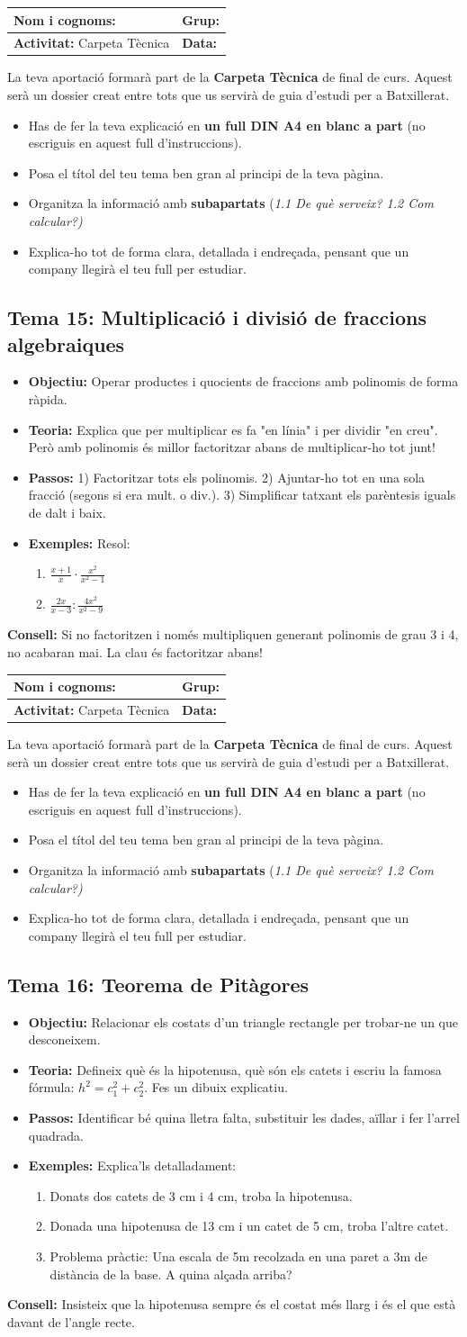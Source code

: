 \documentclass[12pt,a4paper]{article}
\newcommand{\introcomuna}{
    \begin{tcolorbox}[colback=gray!5,colframe=gray!50!black,title=\textbf{La Carpeta Tècnica de Matemàtiques}]
    La teva aportació formarà part de la \textbf{Carpeta Tècnica} de final de curs. Aquest serà un dossier creat entre tots que us servirà de guia d'estudi per a Batxillerat.
    
    \begin{itemize}[label=\textbullet, leftmargin=*]
        \item Has de fer la teva explicació en \textbf{un full DIN A4 en blanc a part} (no escriguis en aquest full d'instruccions).
        \item Posa el títol del teu tema ben gran al principi de la teva pàgina.
        \item Organitza la informació amb \textbf{subapartats} (\textit{1.1 De què serveix? 1.2 Com calcular?)}
        \item Explica-ho tot de forma clara, detallada i endreçada, pensant que un company llegirà el teu full per estudiar.
    \end{itemize}
    \end{tcolorbox}
    \vspace{0.1cm}
}
\newcommand{\capcaleraalumne}[1]{
    \begingroup
    \renewcommand{\arraystretch}{2.2}
    \begin{tabularx}{\textwidth}{|X|p{4cm}|}
    \hline
    \textbf{Nom i cognoms:} & \textbf{Grup:} \\ \hline
    \textbf{Activitat:} Carpeta Tècnica & \textbf{Data:} \\ \hline
    \end{tabularx}
    \endgroup
    \vspace{0.4cm}
}
\begin{document}
\newpage
\capcaleraalumne{15}
\introcomuna
\subsection*{Tema 15: Multiplicació i divisió de fraccions algebraiques}
\begin{itemize}[label=\textbullet]
    \item \textbf{Objectiu:} Operar productes i quocients de fraccions amb polinomis de forma ràpida.
    \item \textbf{Teoria:} Explica que per multiplicar es fa "en línia" i per dividir "en creu". Però amb polinomis és millor factoritzar abans de multiplicar-ho tot junt!
    \item \textbf{Passos:} 1) Factoritzar tots els polinomis. 2) Ajuntar-ho tot en una sola fracció (segons si era mult. o div.). 3) Simplificar tatxant els parèntesis iguals de dalt i baix.
    \item \textbf{Exemples:} Resol:
    \begin{enumerate}[label=\alph*)]
        \item $\displaystyle \frac{x+1}{x} \cdot \frac{x^2}{x^2-1}$
        \item $\displaystyle \frac{2x}{x-3} : \frac{4x^2}{x^2-9}$
    \end{enumerate}
\end{itemize}
\vfill
\noindent\textbf{Consell:} Si no factoritzen i només multipliquen generant polinomis de grau 3 i 4, no acabaran mai. La clau és factoritzar abans!

\newpage
\capcaleraalumne{16}
\introcomuna
\subsection*{Tema 16: Teorema de Pitàgores}
\begin{itemize}[label=\textbullet]
    \item \textbf{Objectiu:} Relacionar els costats d'un triangle rectangle per trobar-ne un que desconeixem.
    \item \textbf{Teoria:} Defineix què és la hipotenusa, què són els catets i escriu la famosa fórmula: $h^2 = c_1^2 + c_2^2$. Fes un dibuix explicatiu.
    \item \textbf{Passos:} Identificar bé quina lletra falta, substituir les dades, aïllar i fer l'arrel quadrada.
    \item \textbf{Exemples:} Explica'ls detalladament:
    \begin{enumerate}[label=\alph*)]
        \item Donats dos catets de 3 cm i 4 cm, troba la hipotenusa.
        \item Donada una hipotenusa de 13 cm i un catet de 5 cm, troba l'altre catet.
        \item Problema pràctic: Una escala de 5m recolzada en una paret a 3m de distància de la base. A quina alçada arriba?
    \end{enumerate}
\end{itemize}
\vfill
\noindent\textbf{Consell:} Insisteix que la hipotenusa sempre és el costat més llarg i és el que està davant de l'angle recte.
\end{document}
